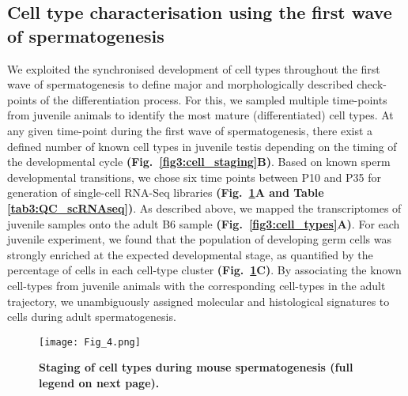 \subsection{Cell type characterisation using the first wave of spermatogenesis}
 
We exploited the synchronised development of cell types throughout the first wave of spermatogenesis to define major and morphologically described check-points of the differentiation process. For this, we sampled multiple time-points from juvenile animals to identify the most mature (differentiated) cell types. At any given time-point during the first wave of spermatogenesis, there exist a defined number of known cell types in juvenile testis depending on the timing of the developmental cycle \textbf{(Fig.~\ref{fig3:cell_staging}B)}. Based on known sperm developmental transitions, we chose six time points between P10 and P35 for generation of single-cell RNA-Seq libraries \textbf{(Fig.~\ref{fig3:1st_wave}A and Table \ref{tab3:QC_scRNAseq})}. As described above, we mapped the transcriptomes of juvenile samples onto the adult B6 sample \textbf{(Fig.~\ref{fig3:cell_types}A)}. For each juvenile experiment, we found that the population of developing germ cells was strongly enriched at the expected developmental stage, as quantified by the percentage of cells in each cell-type cluster \textbf{(Fig.~\ref{fig3:1st_wave}C)}. By associating the known cell-types from juvenile animals with the corresponding cell-types in the adult trajectory, we unambiguously assigned molecular and histological signatures to cells during adult spermatogenesis.

\newpage

\begin{figure}[!h]
\centering
\texttt{[image: Fig\_4.png]}
\caption[Staging of cell types during mouse spermatogenesis]{\textbf{Staging of cell types during mouse spermatogenesis (full legend on next page).}}
\label{fig3:1st_wave}
\end{figure}

\newpage

